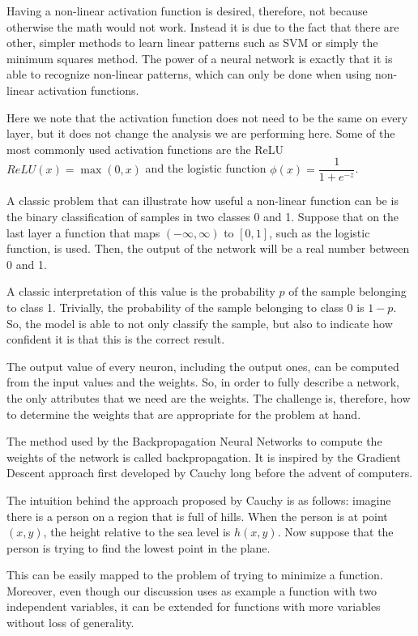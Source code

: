 Having a non-linear activation function is desired, therefore, not because otherwise the math would not work.
Instead it is due to the fact that there are other, simpler methods to learn linear patterns such as SVM or simply the minimum squares method.
The power of a neural network is exactly that it is able to recognize non-linear patterns, which can only be done when using non-linear activation functions.

Here we note that the activation function does not need to be the same on every layer, but it does not change the analysis we are performing here.
Some of the most commonly used activation functions are the ReLU $ReLU(x) = \max(0, x)$ and the logistic function $\phi(x) = \dfrac{1}{1+e^{-z}}$.

A classic problem that can illustrate how useful a non-linear function can be is the binary classification of samples in two classes 0 and 1.
Suppose that on the last layer a function that maps $(-\infty, \infty)$ to $[0,1]$, such as the logistic function, is used.
Then, the output of the network will be a real number between 0 and 1.

A classic interpretation of this value is the probability $p$ of the sample belonging to class 1.
Trivially, the probability of the sample belonging to class 0 is $1-p$.
So, the model is able to not only classify the sample, but also to indicate how confident it is that this is the correct result.

The output value of every neuron, including the output ones, can be computed from the input values and the weights.
So, in order to fully describe a network, the only attributes that we need are the weights.
The challenge is, therefore, how to determine the weights that are appropriate for the problem at hand.

The method used by the Backpropagation Neural Networks to compute the weights of the network is called backpropagation.
It is inspired by the Gradient Descent approach first developed by Cauchy \cite{lemarechal2012cauchy} long before the advent of computers.

The intuition behind the approach proposed by Cauchy is as follows: imagine there is a person on a region that is full of hills.
When the person is at point $(x, y)$, the height relative to the sea level is $h(x, y)$.
Now suppose that the person is trying to find the lowest point in the plane.

This can be easily mapped to the problem of trying to minimize a function.
Moreover, even though our discussion uses as example a function with two independent variables, it can be extended for functions with more variables without loss of generality.

